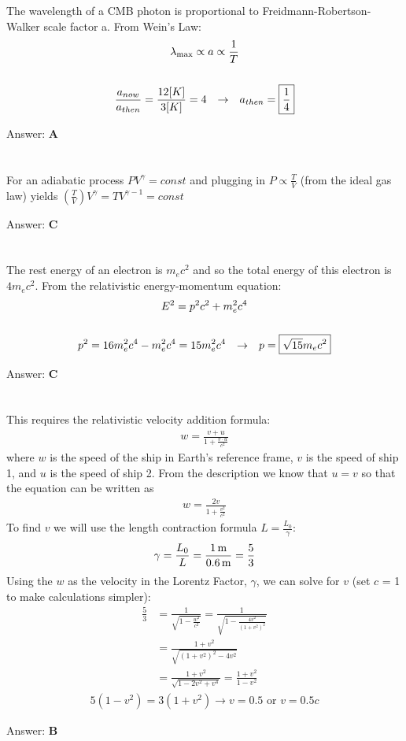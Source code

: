 \documentclass[12pt]{article}
\newcommand{\Answer}[1]{Answer: \textbf{#1}}
\newcommand{\Problem}[3]{
    \setcounter{section}{#1}
    \addtocounter{section}{-1}
    \section{}
    #3\par\par
    \Answer{#2}
}
\begin{document}
\Problem{20}{A}{%
The wavelength of a CMB photon is proportional to Freidmann-Robertson-Walker scale factor a. From Wein's Law:
\begin{gather}
\lambda_{\max} \propto a \propto \frac{1}{T} \\
\nonumber\\
\frac{a_{now}}{a_{then}} = \frac{12 [K]}{3 [K]} = 4\hspace{.1in} \rightarrow \hspace{.1in} a_{then} = \boxed{\frac{1}{4}}\nonumber
\end{gather}
}


\Problem{21}{C}{%
For an adiabatic process $P V^\gamma = const$ and plugging in $P \propto \frac{T}{V}$ (from the ideal gas law) yields $\left(\frac{T}{V}\right) V^\gamma = T V^{\gamma-1}= const$
}

\Problem{22}{C}{%
The rest energy of an electron is $m_e c^2$ and so the total energy of this electron is $4 m_e c^2$. From the relativistic energy-momentum equation:
\begin{gather}
E^2 = p^2c^2 + m_e^2 c^4\\
\nonumber\\
p^2 = 16 m_e^2 c^4 - m_e^2 c^4 = 15 m_e^2 c^4\hspace{.1in} \rightarrow \hspace{.1in} p = \boxed{\sqrt{15}m_e c^2}\nonumber
\end{gather}
}

\Problem{23}{B}{%
This requires the relativistic velocity addition formula:
\begin{align}
w = \frac{v + u}{1+\frac{v \cdot u}{c^{2}}}
\end{align}
where $w$ is the speed of the ship in Earth's reference frame, $v$ is the speed of ship 1, and $u$ is the speed of ship 2. From the description we know that $u = v$ so that the equation can be written as
\begin{align}
w = \frac{2v}{1+\frac{v^2}{c^{2}}}\nonumber
\end{align}
To find $v$ we will use the length contraction formula $L = \frac{L_{0}}{\gamma}$:
\begin{align}
\gamma = \frac{L_{0}}{L} = \frac{1\,\text{m}}{0.6\,\text{m}} = \frac{5}{3}\nonumber
\end{align}
Using the $w$ as the velocity in the Lorentz Factor, $\gamma$, we can solve for $v$ (set $c$ = 1 to make calculations simpler):
\begin{align}
\frac{5}{3} &= \frac{1}{\sqrt{1- \frac{w^2}{c^{2}}}} = \frac{1}{\sqrt{1- \frac{4v^{2}}{{(1+v^{2})}^{2}}}}\nonumber\\
&= \frac{1+v^{2}}{\sqrt{{(1+v^{2})}^2 - 4v^{2}}}\nonumber\\
&= \frac{1+v^{2}}{\sqrt{1-2v^2+v^4}} = \frac{1+v^{2}}{1-v^2}\nonumber
\end{align}
\begin{align}
5(1-v^2) = 3(1+v^2) \rightarrow v = 0.5 \text{ or } \boxed{v = 0.5 c}\nonumber
\end{align}
}
\end{document}
